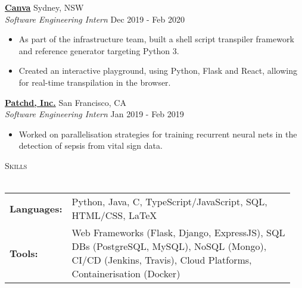 \documentclass[a4paper]{article}
\newcommand{\lineunder} {
    \vspace*{-8pt} \\
    \hspace*{-10pt} \hrulefill \\
}
\newcommand{\header} [1] {
    {\hspace*{-10pt}\vspace*{6pt} \textsc{#1}}
    \vspace*{-6pt} \lineunder
}
\newenvironment{myitemize}
{   \small
    \vspace{-2pt}
    \begin{itemize}
    \setlength{\itemsep}{0pt}
    \setlength{\parskip}{0pt}
    \setlength{\parsep}{0pt}     }
{ \end{itemize}                  }
\begin{document}
\textbf{\href{https://www.canva.com/}{Canva}} \hfill Sydney, NSW\\
\textit{Software Engineering Intern} \hfill Dec 2019 - Feb 2020\\
\begin{myitemize} \itemsep 0.5mm
	\item As part of the infrastructure team, built a shell script transpiler framework and reference generator targeting Python 3.
	\item Created an interactive playground, using Python, Flask and React, allowing for real-time transpilation in the browser.
\end{myitemize}

\textbf{\href{https://www.patchdmedical.com/}{Patchd, Inc.}} \hfill San Francisco, CA\\
\textit{Software Engineering Intern} \hfill  Jan 2019 - Feb 2019\\
\begin{myitemize} \itemsep 0.5mm
	\item Worked on parallelisation strategies for training recurrent neural nets in the detection of sepsis from vital sign data.
\end{myitemize}

\vspace{0.5mm}
\header{Skills}
\vspace{1.5mm}
\begin{tabular}{p{0.12\linewidth}p{0.83\linewidth}}
	\textbf{Languages:} & Python, Java, C, TypeScript/JavaScript, SQL, HTML/CSS, \LaTeX \\
	\textbf{Tools:} & Web Frameworks (Flask, Django, ExpressJS), SQL DBs (PostgreSQL, MySQL), NoSQL (Mongo), CI/CD (Jenkins, Travis), Cloud Platforms, Containerisation (Docker)
\end{tabular}
\end{document}
